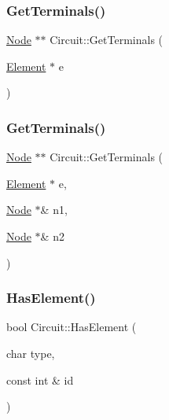 \subsubsection{\texorpdfstring{Get\+Terminals()}{GetTerminals()}\hspace{0.1cm}{\footnotesize\ttfamily [1/2]}}
{\footnotesize\ttfamily \hyperlink{class_node}{Node} $\ast$$\ast$ Circuit\+::\+Get\+Terminals (\begin{DoxyParamCaption}\item[{\hyperlink{class_element}{Element} $\ast$}]{e }\end{DoxyParamCaption})}

\mbox{\label{class_circuit_a1e4a92a398972c7dbf8a19c4943626bc}} 
\subsubsection{\texorpdfstring{Get\+Terminals()}{GetTerminals()}\hspace{0.1cm}{\footnotesize\ttfamily [2/2]}}
{\footnotesize\ttfamily \hyperlink{class_node}{Node} $\ast$$\ast$ Circuit\+::\+Get\+Terminals (\begin{DoxyParamCaption}\item[{\hyperlink{class_element}{Element} $\ast$}]{e,  }\item[{\hyperlink{class_node}{Node} $\ast$\&}]{n1,  }\item[{\hyperlink{class_node}{Node} $\ast$\&}]{n2 }\end{DoxyParamCaption})}

\mbox{\label{class_circuit_adbe87d6a9e119ddc538fd3354ba51ca7}} 
\subsubsection{\texorpdfstring{Has\+Element()}{HasElement()}}
{\footnotesize\ttfamily bool Circuit\+::\+Has\+Element (\begin{DoxyParamCaption}\item[{char}]{type,  }\item[{const int \&}]{id }\end{DoxyParamCaption})}

\mbox{\label{class_circuit_accc2583f39aa8860782a5a74b5badf74}} 
